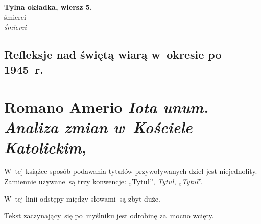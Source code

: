 \documentclass[a4paper,11pt]{article}
\numberwithin{equation}{section}
\begin{document}
\VerSpaceTwo


\noindent
\textbf{Tylna okładka, wiersz 5.} \\
\Jest śmierci \\
\PowinnoByc \textit{śmierci} \\











\newpage

\subsection{Refleksje nad świętą wiarą w~okresie po 1945~r.}

\VerSpaceThree



\section{Romano Amerio \textit{Iota unum. Analiza zmian
    w~Kościele Katolickim},
  \cite{AmerioIotaUnum}}


\vspace{0em}



\vspace{0em}


\noindent
W~tej książce sposób podawania tytułów przywoływanych dzieł
jest niejednolity. Zamiennie używane~są trzy konwencje: „Tytuł”,
\textit{Tytuł}, „\textit{Tytuł}”.

\VerSpaceFour





\noindent
{} W~tej linii odstępy między słowami~są zbyt duże.

\VerSpaceFour





\noindent
{} Tekst zaczynający~się po~myślniku jest odrobinę
za~mocno
wcięty.

\VerSpaceFour
\end{document}
